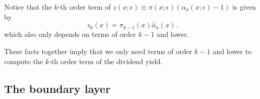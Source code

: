 \documentclass[11pt,english]{article}
\begin{document}
Notice that the $k$-th order term of $z(x;\epsilon) \equiv \pi(x;\epsilon) (  \alpha_{a}(x;\epsilon)-1)$ is given by
\begin{equation}
    z_k(x) = \pi_{k-1}(x) \hat{\alpha}_{a}(x).
\end{equation}
which also only depends on terms of order $k-1$ and lower. 


These facts together imply that we only need terms of order $k-1$ and lower to compute the $k$-th order term of the dividend yield.

\subsection{The boundary layer}



\newpage
\singlespacing
%
\clearpage

\end{document}
